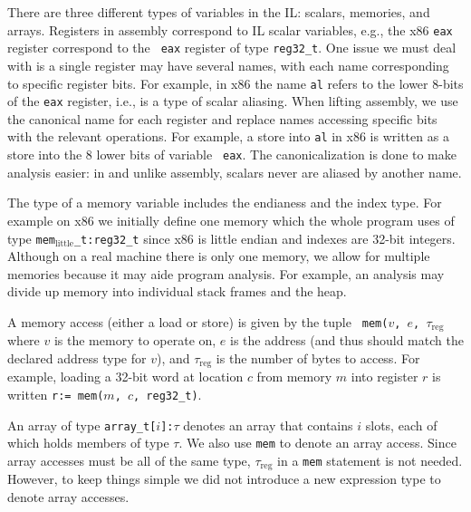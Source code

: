There are three different types of variables in the IL: scalars,
memories, and arrays. Registers in assembly correspond to IL scalar
variables, e.g., the x86 {\tt eax} register correspond to the {\tt
  eax} register of type {\tt reg32\_t}.  One issue we must deal with
is a single register may have several names, with each name
corresponding to specific register bits. For example, in x86 the name
{\tt al} refers to the lower 8-bits of the {\tt eax} register, i.e.,
is a type of scalar aliasing.  When lifting assembly, we use the
canonical name for each register and replace names accessing specific
bits with the relevant operations. For example, a store into {\tt al}
in x86 is written as a store into the 8 lower bits of variable {\tt
  eax}.  The canonicalization is done to make analysis easier: in
\bap and unlike assembly, scalars never are aliased by another name.

The type of a memory variable includes the endianess and the index
type. For example on x86 we initially define one memory which the
whole program uses of type {\tt mem$_\text{little}$\_t:reg32\_t} since
x86 is little endian and indexes are 32-bit integers. Although on a
real machine there is only one memory, we allow for multiple memories
because it may aide program analysis.  For example, an analysis may
divide up memory into individual stack frames and the heap.

A memory access (either a load or store) is given by the tuple {\tt
  mem($v$, $e$, $\tau_{\text{reg}}$} where $v$ is the memory to
operate on, $e$ is the address (and thus should match the declared
address type for $v$), and $\tau_{\text{reg}}$ is the number of bytes
to access.  For example, loading a 32-bit word at location $c$ from
memory $m$ into register $r$ is written {\tt r:= mem($m$, $c$,
  reg32\_t)}.

An array of type {\tt array\_t[$i$]:$\tau$} denotes an array that
contains $i$ slots, each of which holds members of type $\tau$. We
also use {\tt mem} to denote an array access. Since array accesses
must be all of the same type, $\tau_{\text{reg}}$ in a {\tt mem}
statement is not needed. However, to keep things simple we did not
introduce a new expression type to denote array accesses.

